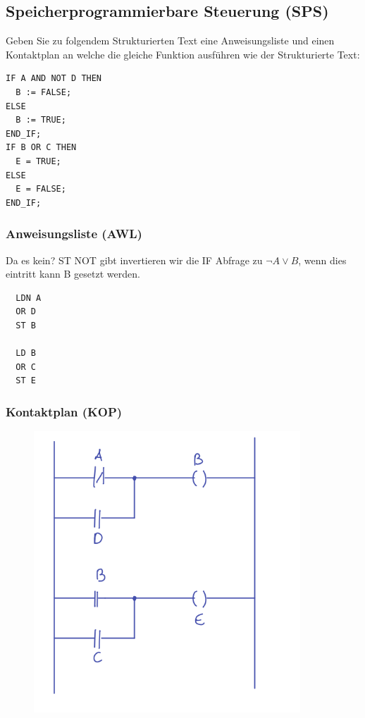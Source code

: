 \subsection{Speicherprogrammierbare Steuerung (SPS)}
Geben Sie zu folgendem Strukturierten Text eine Anweisungsliste und einen Kontaktplan an welche die
gleiche Funktion ausführen wie der Strukturierte Text:

\begin{lstlisting}
IF A AND NOT D THEN
  B := FALSE;
ELSE
  B := TRUE;
END_IF;
IF B OR C THEN
  E = TRUE;
ELSE
  E = FALSE;
END_IF;
\end{lstlisting}

\subsubsection{Anweisungsliste (AWL)}
Da es kein? ST NOT gibt invertieren wir die IF Abfrage zu $\neg A \lor B$, wenn dies eintritt
kann B gesetzt werden.
\begin{lstlisting}
  LDN A
  OR D
  ST B
  
  LD B
  OR C
  ST E
\end{lstlisting}

\subsubsection{Kontaktplan (KOP)}
\begin{figure}[H]
  \includegraphics[width=10cm]{images/KA270921/6a.PNG}
  \centering
\end{figure}